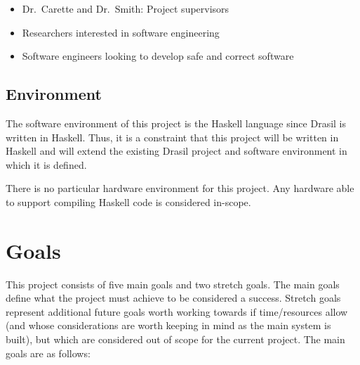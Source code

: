 \documentclass{article}
\begin{document}
\begin{itemize}
\item Dr.~Carette and Dr.~Smith: Project supervisors
\item Researchers interested in software engineering
\item Software engineers looking to develop safe and correct software
\end{itemize}

\subsection{Environment}

The software environment of this project is the Haskell language since Drasil is
written in Haskell. Thus, it is a constraint that this project will be written
in Haskell and will extend the existing Drasil project and software environment
in which it is defined.

There is no particular hardware environment for this project. Any hardware able to
support compiling Haskell code is considered in-scope.


\section{Goals}

This project consists of five main goals and two stretch goals. The main goals define
what the project must achieve to be considered a success. Stretch goals represent
additional future goals worth working towards if time/resources allow (and whose
considerations are worth keeping in mind as the main system is built), but which 
are considered out of scope for the current project. The main goals are as follows:
\end{document}
